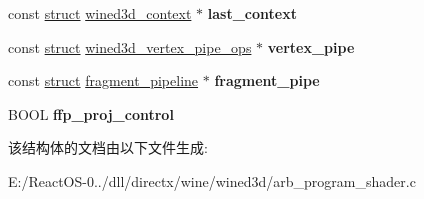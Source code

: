 \begin{DoxyCompactItemize}
\item 
\mbox{\label{structshader__arb__priv_acf0941db25c6bd96301e4fc8ff7b7cda}} 
const \hyperlink{interfacestruct}{struct} \hyperlink{structwined3d__context}{wined3d\+\_\+context} $\ast$ {\bfseries last\+\_\+context}
\item 
\mbox{\label{structshader__arb__priv_afc87bf6deb291b1bdce5ca3d8261c249}} 
const \hyperlink{interfacestruct}{struct} \hyperlink{structwined3d__vertex__pipe__ops}{wined3d\+\_\+vertex\+\_\+pipe\+\_\+ops} $\ast$ {\bfseries vertex\+\_\+pipe}
\item 
\mbox{\label{structshader__arb__priv_a64eef8dee54657a85a9319a099641e19}} 
const \hyperlink{interfacestruct}{struct} \hyperlink{structfragment__pipeline}{fragment\+\_\+pipeline} $\ast$ {\bfseries fragment\+\_\+pipe}
\item 
\mbox{\label{structshader__arb__priv_a8ba37dc297595140b1221463f3e9ae57}} 
B\+O\+OL {\bfseries ffp\+\_\+proj\+\_\+control}
\end{DoxyCompactItemize}


该结构体的文档由以下文件生成\+:\begin{DoxyCompactItemize}
\item 
E\+:/\+React\+O\+S-\/0../dll/directx/wine/wined3d/arb\+\_\+program\+\_\+shader.\+c\end{DoxyCompactItemize}

